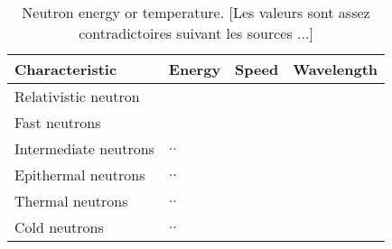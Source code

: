 \begin{table}[ht]
  \centering
  \caption[Neutron energy or temperature]
  {Neutron energy or temperature. [Les valeurs sont assez contradictoires suivant les sources ...]}
  \label{chap1:tab:neutronsT}
  \begin{tabularx}{\linewidth}{lXXX}
    \toprule
    Characteristic        & Energy & Speed & Wavelength \\
    \midrule
    Relativistic neutron  & $ $    &       &            \\
    Fast neutrons         & $ $    &       &            \\
    Intermediate neutrons & $..$   &       &            \\
    Epithermal neutrons   & $..$   &       &            \\
    Thermal neutrons      & $..$   &       &            \\
    Cold neutrons         & $..$   &       &            \\
    \bottomrule
  \end{tabularx}
\end{table}